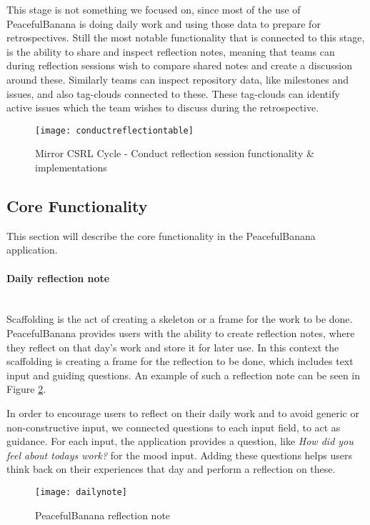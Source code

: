 This stage is not something we focused on, since most of the use of PeacefulBanana is doing daily work and using those data to prepare for retrospectives. Still the most notable functionality that is connected to this stage, is the ability to share and inspect reflection notes, meaning that teams can during reflection sessions wish to compare shared notes and create a discussion around these. Similarly teams can inspect repository data, like milestones and issues, and also tag-clouds connected to these. These tag-clouds can identify active issues which the team wishes to discuss during the retrospective. 
\begin{figure}[H]
\centering
    \texttt{[image: conductreflectiontable]}
\caption{Mirror CSRL Cycle - Conduct reflection session functionality \& implementations}
\label{conductreflectiontable}
\end{figure}

\subsection{Core Functionality}
This section will describe the core functionality in the PeacefulBanana application. 
\paragraph{Daily reflection note}\mbox{}\\
Scaffolding is the act of creating a skeleton or a frame for the work to be done.
PeacefulBanana provides users with the ability to create reflection notes, where they reflect on that day's work and store it for later use. In this context the scaffolding is creating a frame for the reflection to be done, which includes text input and guiding questions. An example of such a reflection note can be seen in Figure \ref{dailynotefunc}. 

In order to encourage users to reflect on their daily work and to avoid generic or non-constructive input, we connected questions to each input field, to act as guidance. For each input, the application provides a question, like \emph{How did you feel about todays work?} for the mood input. Adding these questions helps users think back on their experiences that day and perform a reflection on these. 
\begin{figure}[H]
    \centering
        \texttt{[image: dailynote]}
    \caption{PeacefulBanana reflection note}
    \label{dailynotefunc}
\end{figure}

